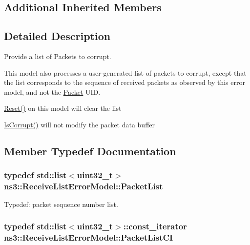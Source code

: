 \subsection*{Additional Inherited Members}


\subsection{Detailed Description}
Provide a list of Packets to corrupt. 

This model also processes a user-\/generated list of packets to corrupt, except that the list corresponds to the sequence of received packets as observed by this error model, and not the \hyperlink{classns3_1_1Packet}{Packet} U\+ID.

\hyperlink{classns3_1_1ErrorModel_a6b7cbe56c27562e5ba6daf2f04bcd282}{Reset()} on this model will clear the list

\hyperlink{classns3_1_1ErrorModel_af75222d384e342b46d0aed09d5e3a3fd}{Is\+Corrupt()} will not modify the packet data buffer 

\subsection{Member Typedef Documentation}
\subsubsection[{\texorpdfstring{Packet\+List}{PacketList}}]{\setlength{\rightskip}{0pt plus 5cm}typedef {\bf std\+::list}$<$uint32\+\_\+t$>$ {\bf ns3\+::\+Receive\+List\+Error\+Model\+::\+Packet\+List}\hspace{0.3cm}{\ttfamily [private]}}\hypertarget{classns3_1_1ReceiveListErrorModel_a2cb1a2eaf5e01b5a4e7998ceb521d11c}{}\label{classns3_1_1ReceiveListErrorModel_a2cb1a2eaf5e01b5a4e7998ceb521d11c}


Typedef\+: packet sequence number list. 

\subsubsection[{\texorpdfstring{Packet\+List\+CI}{PacketListCI}}]{\setlength{\rightskip}{0pt plus 5cm}typedef {\bf std\+::list}$<$uint32\+\_\+t$>$\+::const\+\_\+iterator {\bf ns3\+::\+Receive\+List\+Error\+Model\+::\+Packet\+List\+CI}\hspace{0.3cm}{\ttfamily [private]}}\hypertarget{classns3_1_1ReceiveListErrorModel_a5bee73c9589a9f43e548f2cc38b1db59}{}\label{classns3_1_1ReceiveListErrorModel_a5bee73c9589a9f43e548f2cc38b1db59}


